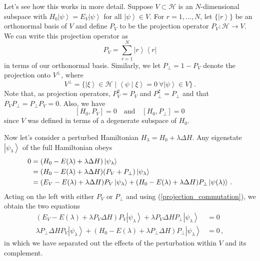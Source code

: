 \documentclass{article}
\theoremstyle{plain}\theoremheaderfont{\normalfont\itshape}\theorembodyfont{\rmfamily}\theoremseparator{.}\newtheorem*{rem}{Remark}\newtheorem*{ex}{Example}\newtheorem*{proof}{Proof}\newtheorem*{altp}{Alternative proof}
\theoremstyle{plain}\theoremheaderfont{\normalfont\bfseries}\theorembodyfont{\rmfamily}\theoremseparator{.}\newtheorem{thm}{Theorem}[section]\newtheorem{lem}[thm]{Lemma}\newtheorem{prop}[thm]{Proposition}\newtheorem*{cor}{Corollary}\newtheorem{defn}[thm]{Definition}\newtheorem{clm}[thm]{Claim}\newtheorem{clminproof}{Claim}
\theoremstyle{break}\theoremheaderfont{\normalfont\itshape}\theorembodyfont{\rmfamily}\theoremseparator{.\medskip}\newtheorem*{proofskip}{Proof}\newtheorem*{exs}{Examples}\newtheorem*{rems}{Remarks}
\theoremstyle{break}\theoremheaderfont{\normalfont\bfseries}\theorembodyfont{\rmfamily}\theoremseparator{.\medskip}\newtheorem{lemskip}[thm]{Lemma}\newtheorem{defnskip}[thm]{Definition}\newtheorem{propskip}[thm]{Proposition}\newtheorem{thmskip}[thm]{Theorem}
\numberwithin{equation}{section}
\newcommand{\bra}[1]{\left\langle #1 \right|}
\newcommand{\ket}[1]{\left| #1 \right\rangle}
\newcommand{\braket}[2]{\left\langle #1 \middle| #2 \right\rangle}
\newcommand{\hb}{\mathcal{H}}
\begin{document}
    Let's see how this works in more detail. Suppose \(V\subset\hb\) is an \(N\)-dimensional subspace with \(H_0\ket{\psi}=E_V\ket{\psi}\) for all \(\ket{\psi}\in V\). For \(r=1,\dots,N\), let \(\{\ket{r}\}\) be an orthonormal basis of \(V\) and define \(P_V\) to be the projection operator \(P_V:\hb\to V\). We can write this projection operator as
    \begin{equation}
        P_V=\sum_{r=1}^{N}\ket{r}\bra{r}
    \end{equation}
    in terms of our orthonormal basis. Similarly, we let \(P_\perp =1-P_V\) denote the projection onto \(V^\perp\), where
    \begin{equation}
        V^\perp=\{\ket{\xi}\in\hb\mid \braket{\psi}{\xi}=0\ \forall\ket{\psi}\in V\}\,.
    \end{equation}
    Note that, as projection operators, \(P_V^2=P_V\) and \(P_\perp^2=P_\perp\) and that \(P_VP_\perp=P_\perp P_V=0\). Also, we have
    \begin{equation}\label{projection_commutation}
        [H_0,P_V]=0\quad\text{and}\quad[H_0,P_\perp]=0
    \end{equation}
    since \(V\) was defined in terms of a degenerate subspace of \(H_0\).

    Now let's consider a perturbed Hamiltonian \(H_\lambda=H_0+\lambda\Delta H\). Any eigenstate \(\ket{\psi_\lambda}\) of the full Hamiltonian obeys
    \begin{align}
        0&=(H_0-E(\lambda)+\lambda\Delta H)\ket{\psi_\lambda}\notag\\
        &=(H_0-E(\lambda)+\lambda\Delta H)(P_V+P_\perp)\ket{\psi_\lambda}\notag\\
        &=(E_V-E(\lambda)+\lambda\Delta H)P_V\ket{\psi_\lambda}+(H_0-E(\lambda)+\lambda\Delta H)P_\perp\ket{\psi(\lambda)}\,.
    \end{align}
    Acting on the left with either \(P_V\) or \(P_\perp\) and using (\ref{projection_commutation}), we obtain the two equations
    \begin{align}
        (E_V-E(\lambda)+\lambda P_V\Delta H)P_V\ket{\psi_\lambda}+\lambda P_V\Delta H P_\perp\ket{\psi_\lambda}&=0\label{degenerate_PV}\\
        \lambda P_\perp\Delta H P_V\ket{\psi_\lambda}+(H_0-E(\lambda)+\lambda P_\perp\Delta H)P_\perp\ket{\psi_\lambda}&=0\,,
    \end{align}
    in which we have separated out the effects of the perturbation within \(V\) and its complement.
\end{document}
